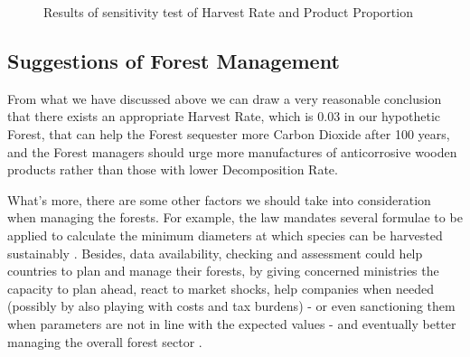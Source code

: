 \documentclass{mcmthesis}
\numberwithin{figure}{section}
\numberwithin{table}{section}
\numberwithin{equation}{section}
\begin{document}
\begin{figure}[htbp]
  \centering
\caption{Results of sensitivity test of Harvest Rate and Product Proportion}
\end{figure}

\subsection{Suggestions of Forest Management}
From what we have discussed above we can draw a very reasonable conclusion that 
there exists an appropriate Harvest Rate, which is 0.03 in our hypothetic Forest, 
that can help the Forest sequester more Carbon Dioxide after 100 years, and
the Forest managers should urge more manufactures of anticorrosive wooden products
rather than those with lower Decomposition Rate. 
\par
What's more, there are some other factors we should take into consideration when 
managing the forests. For example, the law mandates several formulae to be applied 
to calculate the minimum diameters at which species can be harvested 
sustainably \citep{lumet1993etude}. Besides, data availability, checking and 
assessment could help countries to plan and manage their forests, by giving 
concerned ministries the capacity to plan ahead, react to market shocks, help
companies when needed (possibly by also playing with costs and
tax burdens) - or even sanctioning them when parameters are not
in line with the expected values - and eventually better managing
the overall forest sector \citep{2017Cerutti}.
\end{document}
